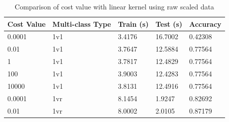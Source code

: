 \documentclass[a4paper, 10pt, conference]{ieeeconf}
\begin{document}
\begin{table}[!ht]
\centering
\caption{Comparison of cost value with linear kernel using raw scaled data}\label{tbl:linear_params}
\begin{tabular}{lllll}
\textbf{Cost Value} & \textbf{Multi-class Type} & \textbf{Train (s)} & \textbf{Test (s)} & \textbf{Accuracy}\\ \hline
0.0001 & 1v1 & 3.4176 & 16.7002 & 0.42308\\ \hline
0.01 & 1v1 & 3.7647 & 12.5884 & 0.77564\\ \hline
1 & 1v1 & 3.7817 & 12.4829 & 0.77564\\ \hline
100 & 1v1 & 3.9003 & 12.4283 & 0.77564\\ \hline
10000 & 1v1 & 3.8131 & 12.4916 & 0.77564\\ \hline
0.0001 & 1vr & 8.1454 & 1.9247 & 0.82692\\ \hline
0.01 & 1vr & 8.0002 & 2.0105 & 0.87179\\ \hline

\end{tabular}
\end{table}
\end{document}

